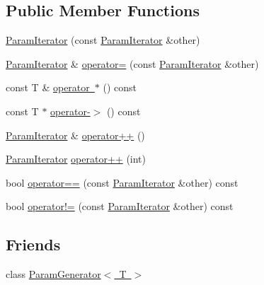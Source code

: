 \subsection*{Public Member Functions}
\begin{DoxyCompactItemize}
\item 
\mbox{\hyperlink{classtesting_1_1internal_1_1ParamIterator_aa10585055ee055e304703a3004f24f33}{Param\+Iterator}} (const \mbox{\hyperlink{classtesting_1_1internal_1_1ParamIterator}{Param\+Iterator}} \&other)
\item 
\mbox{\hyperlink{classtesting_1_1internal_1_1ParamIterator}{Param\+Iterator}} \& \mbox{\hyperlink{classtesting_1_1internal_1_1ParamIterator_a8019f54ea1c66ca39ffdec47acfabfe6}{operator=}} (const \mbox{\hyperlink{classtesting_1_1internal_1_1ParamIterator}{Param\+Iterator}} \&other)
\item 
const T \& \mbox{\hyperlink{classtesting_1_1internal_1_1ParamIterator_aa024380a4cc0cfdcaa114e942c348fce}{operator $\ast$}} () const
\item 
const T $\ast$ \mbox{\hyperlink{classtesting_1_1internal_1_1ParamIterator_aad035d35e8f0c1412854959a94d4887e}{operator-\/$>$}} () const
\item 
\mbox{\hyperlink{classtesting_1_1internal_1_1ParamIterator}{Param\+Iterator}} \& \mbox{\hyperlink{classtesting_1_1internal_1_1ParamIterator_ab0922f2f554fb3beaf13c442da605e8d}{operator++}} ()
\item 
\mbox{\hyperlink{classtesting_1_1internal_1_1ParamIterator}{Param\+Iterator}} \mbox{\hyperlink{classtesting_1_1internal_1_1ParamIterator_af51e17827dd54977165937550c0fb030}{operator++}} (int)
\item 
bool \mbox{\hyperlink{classtesting_1_1internal_1_1ParamIterator_adc356b4789eb0c2a1b5b033c7874e5a6}{operator==}} (const \mbox{\hyperlink{classtesting_1_1internal_1_1ParamIterator}{Param\+Iterator}} \&other) const
\item 
bool \mbox{\hyperlink{classtesting_1_1internal_1_1ParamIterator_a7a6aee04e8e44b5c8294929951cfac2b}{operator!=}} (const \mbox{\hyperlink{classtesting_1_1internal_1_1ParamIterator}{Param\+Iterator}} \&other) const
\end{DoxyCompactItemize}
\subsection*{Friends}
\begin{DoxyCompactItemize}
\item 
class \mbox{\hyperlink{classtesting_1_1internal_1_1ParamIterator_ab73a355ae191f2f7eab54b65ca557714}{Param\+Generator$<$ T $>$}}
\end{DoxyCompactItemize}


